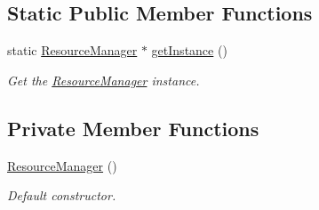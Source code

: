 \subsection*{Static Public Member Functions}
\begin{DoxyCompactItemize}
\item 
\mbox{\label{class_resource_manager_a41943f7fb045ad54f1e24da7c6046502}} 
static \mbox{\hyperlink{class_resource_manager}{Resource\+Manager}} $\ast$ \mbox{\hyperlink{class_resource_manager_a41943f7fb045ad54f1e24da7c6046502}{get\+Instance}} ()
\begin{DoxyCompactList}\small\item\em Get the \mbox{\hyperlink{class_resource_manager}{Resource\+Manager}} instance. \end{DoxyCompactList}\end{DoxyCompactItemize}
\subsection*{Private Member Functions}
\begin{DoxyCompactItemize}
\item 
\mbox{\label{class_resource_manager_a3b32babd2e81909bbd90d7f2d566fadb}} 
\mbox{\hyperlink{class_resource_manager_a3b32babd2e81909bbd90d7f2d566fadb}{Resource\+Manager}} ()
\begin{DoxyCompactList}\small\item\em Default constructor. \end{DoxyCompactList}\end{DoxyCompactItemize}
